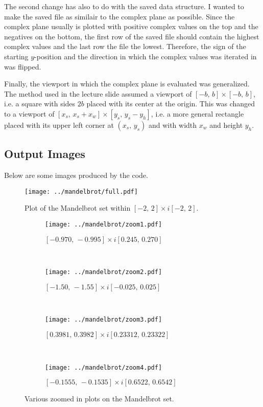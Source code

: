 \documentclass{article}
\begin{document}
The second change has also to do with the saved data structure.
I wanted to make the saved file as similair to the complex plane as possible.
Since the complex plane usually is plotted with positive complex values on the top
and the negatives on the bottom,
the first row of the saved file should contain the highest complex values
and the last row the file the lowest.
Therefore, the sign of the starting $y$-position
and the direction in which the complex values was iterated in was flipped.

Finally, the viewport in which the complex plane is evaluated was generalized.
The method used in the lecture slide assumed a viewport of $[-b,\,b] \times [-b,\,b]$,
i.e. a square with sides $2b$ placed with its center at the origin.
This was changed to a viewport of $[x_s,\,x_s+x_w] \times [y_s,\,y_s-y_h]$,
i.e. a more general rectangle placed with its upper left corner at $(x_s,\,y_s)$
and with width $x_w$ and height $y_h$.

\subsection*{Output Images}
Below are some images produced by the code.
\begin{figure}[!ht]
  \centering
  \texttt{[image: ../mandelbrot/full.pdf]}
  \caption{Plot of the Mandelbrot set within $[-2,\,2] \times i[-2,\,2]$.}
  \label{fig:standardview}
\end{figure}

\begin{figure}[!ht]
  \centering

  \begin{subfigure}[t]{0.45\textwidth}
    \centering
    \texttt{[image: ../mandelbrot/zoom1.pdf]}
    \caption{$[-0.970,\,-0.995] \times i[0.245,\,0.270]$}
  \end{subfigure}
  ~
  \begin{subfigure}[t]{0.45\textwidth}
    \centering
    \texttt{[image: ../mandelbrot/zoom2.pdf]}
    \caption{$[-1.50,\,-1.55] \times i[-0.025,\,0.025]$}
  \end{subfigure}
  ~
  \begin{subfigure}[t]{0.45\textwidth}
    \centering
    \texttt{[image: ../mandelbrot/zoom3.pdf]}
    \caption{$[0.3981,\,0.3982] \times i[0.23312,\,0.23322]$}
  \end{subfigure}
  ~
  \begin{subfigure}[t]{0.45\textwidth}
    \centering
    \texttt{[image: ../mandelbrot/zoom4.pdf]}
    \caption{$[-0.1555,\,-0.1535] \times i[0.6522,\,0.6542]$}
  \end{subfigure}

  \caption{Various zoomed in plots on the Mandelbrot set.}
\end{figure}
\end{document}
